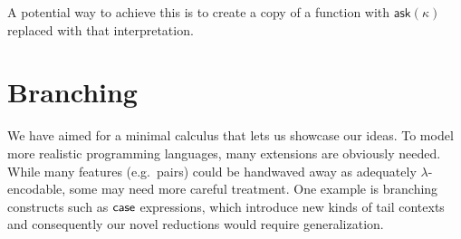 \documentclass[a4paper, 11pt,titlepage, openright, twoside]{report}
\newcommand{\keyword}[1]{\textsf{\textup{#1}}}
\newcommand{\KwHandle}{\keyword{handle}}
\newcommand{\Handle}{\KwHandle\;}
\newcommand{\KwWith}{\keyword{with}}
\newcommand{\With}{\;\KwWith\;}
\newcommand{\Ask}{\textsf{ask}}
\newcommand{\Letrec}[3]{\keyword{letrec}\:#1\:\keyword{=}\:#2\:\keyword{in}\:#3}
\newcommand{\+}{\enspace}
\begin{document}
A potential way to achieve this is
to create a copy of a function with $\Ask(κ)$ replaced with that interpretation.


\section{Branching}
We have aimed for a minimal calculus that lets us showcase our ideas.
To model more realistic programming languages,
many extensions are obviously needed.
While many features (e.g.\  pairs)
could be handwaved away as adequately $λ$-encodable,
some may need more careful treatment.
One example is branching constructs such as $\keyword{case}$ expressions,
which introduce new kinds of tail contexts
and consequently our novel reductions would require generalization.

\printbibliography[heading=bibintoc]
\end{document}
